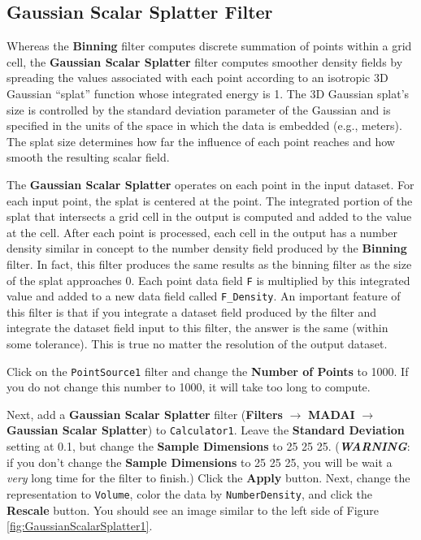 \documentclass[12pt]{article}
\newcommand{\filter}[1]{\textbf{#1}}
\newcommand{\filterinstance}[1]{\texttt{#1}}
\newcommand{\menu}[1]{\textbf{#1}}
\newcommand{\representation}[1]{\texttt{#1}}
\newcommand{\setting}[1]{\textbf{#1}}
\newcommand{\field}[1]{\texttt{#1}}
\begin{document}
\subsection{Gaussian Scalar Splatter Filter}

Whereas the \filter{Binning} filter computes discrete summation of points within a grid cell, the \filter{Gaussian Scalar Splatter} filter computes smoother density fields by spreading the values associated with each point according to an isotropic 3D Gaussian ``splat'' function whose integrated energy is 1. The 3D Gaussian splat's size is controlled by the standard deviation parameter of the Gaussian and is specified in the units of the space in which the data is embedded (e.g., meters). The splat size determines how far the influence of each point reaches and how smooth the resulting scalar field.

The \filter{Gaussian Scalar Splatter} operates on each point in the input dataset. For each input point, the splat is centered at the point. The integrated portion of the splat that intersects a grid cell in the output is computed and added to the value at the cell. After each point is processed, each cell in the output has a number density similar in concept to the number density field produced by the \filter{Binning} filter. In fact, this filter produces the same results as the binning filter as the size of the splat approaches 0. Each point data field \field{F} is multiplied by this integrated value and added to a new data field called \field{F\_Density}. An important feature of this filter is that if you integrate a dataset field produced by the filter and integrate the dataset field input to this filter, the answer is the same (within some tolerance). This is true no matter the resolution of the output dataset.

Click on the \filterinstance{PointSource1} filter and change the \setting{Number of Points} to 1000. If you do not change this number to 1000, it will take too long to compute.

Next, add a \filter{Gaussian Scalar Splatter} filter (\menu{Filters} $\rightarrow$ \menu{MADAI} $\rightarrow$ \menu{Gaussian Scalar Splatter}) to \filterinstance{Calculator1}. Leave the \textbf{Standard Deviation} setting at 0.1, but change the \textbf{Sample Dimensions} to 25 25 25. (\emph{\textbf{WARNING}}: if you don't change the \textbf{Sample Dimensions} to 25 25 25, you will be wait a \emph{very} long time for the filter to finish.) Click the \setting{Apply} button. Next, change the representation to \representation{Volume}, color the data by \field{NumberDensity}, and click the \setting{Rescale} button. You should see an image similar to the left side of Figure \ref{fig:GaussianScalarSplatter1}.
\end{document}
